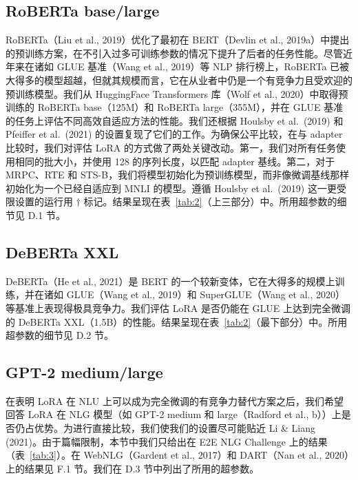\documentclass[11pt,UTF8,fontset=fandol]{ctexart}
\begin{document}
\subsection{RoBERTa base/large}

RoBERTa（Liu et al., 2019）优化了最初在 BERT（Devlin et al., 2019a）中提出的预训练方案，在不引入过多可训练参数的情况下提升了后者的任务性能。尽管近年来在诸如 GLUE 基准（Wang et al., 2019）等 NLP 排行榜上，RoBERTa 已被大得多的模型超越，但就其规模而言，它在从业者中仍是一个有竞争力且受欢迎的预训练模型。我们从 HuggingFace Transformers 库（Wolf et al., 2020）中取得预训练的 RoBERTa base（125M）和 RoBERTa large（355M），并在 GLUE 基准的任务上评估不同高效自适应方法的性能。我们还根据 Houlsby et al.\ (2019) 和 Pfeiffer et al.\ (2021) 的设置复现了它们的工作。为确保公平比较，在与 adapter 比较时，我们对评估 LoRA 的方式做了两处关键改动。第一，我们对所有任务使用相同的批大小，并使用 128 的序列长度，以匹配 adapter 基线。第二，对于 MRPC、RTE 和 STS-B，我们将模型初始化为预训练模型，而非像微调基线那样初始化为一个已经自适应到 MNLI 的模型。遵循 Houlsby et al.\ (2019) 这一更受限设置的运行用 $\dagger$ 标记。结果呈现在表~\ref{tab:2}（上三部分）中。所用超参数的细节见 D.1 节。

\subsection{DeBERTa XXL}

DeBERTa（He et al., 2021）是 BERT 的一个较新变体，它在大得多的规模上训练，并在诸如 GLUE（Wang et al., 2019）和 SuperGLUE（Wang et al., 2020）等基准上表现得极具竞争力。我们评估 LoRA 是否仍能在 GLUE 上达到完全微调的 DeBERTa XXL（1.5B）的性能。结果呈现在表~\ref{tab:2}（最下部分）中。所用超参数的细节见 D.2 节。

\subsection{GPT-2 medium/large}

在表明 LoRA 在 NLU 上可以成为完全微调的有竞争力替代方案之后，我们希望回答 LoRA 在 NLG 模型（如 GPT-2 medium 和 large（Radford et al., b））上是否仍占优势。为进行直接比较，我们使我们的设置尽可能贴近 Li \& Liang (2021)。由于篇幅限制，本节中我们只给出在 E2E NLG Challenge 上的结果（表~\ref{tab:3}）。在 WebNLG（Gardent et al., 2017）和 DART（Nan et al., 2020）上的结果见 F.1 节。我们在 D.3 节中列出了所用的超参数。
\end{document}
